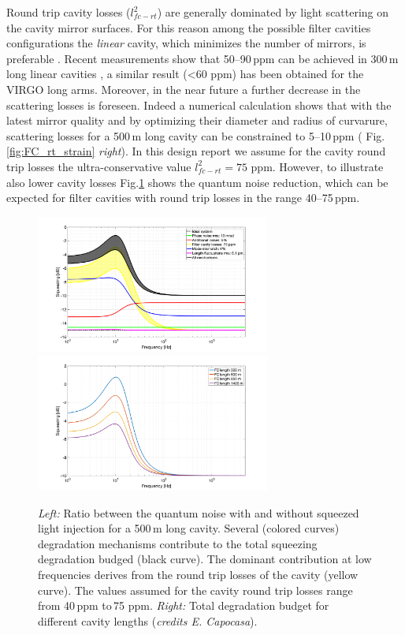 %
Round trip cavity losses ($l^2_{fc-rt}$) are generally dominated by light scattering on the cavity  mirror surfaces. For this reason among the possible filter cavities configurations the {\it linear} cavity, which minimizes the number of mirrors, is preferable \cite{Evans2013}.  Recent measurements show that 50--90\,ppm can be achieved in 300\,m long linear cavities \citep{Capocasa2018}, a similar result (<60 ppm) has been obtained  for the VIRGO long arms.  Moreover, in the near future a further decrease in the scattering losses is foreseen. Indeed a numerical calculation shows that  with the latest  mirror quality and by optimizing their  diameter and radius of curvarure, scattering losses for a 500\,m long cavity can be constrained to 5--10\,ppm ( Fig.\ref{fig:FC_rt_strain} {\it right}).
%
In this design report we assume for the cavity round trip losses the ultra-conservative value $l^2_{fc-rt}=75$ ppm. However, to illustrate also lower cavity losses Fig.\ref{fig:FCoptimization} shows the quantum noise reduction, which can be expected for filter cavities with round trip losses in the range 40--75\,ppm. 
%
\begin{figure}%
\includegraphics[width=77mm]{./Detector/DetFigures/ET_FC.png}
\includegraphics[width=77mm]{./Detector/DetFigures/FClength.png}
\caption{ {\it Left:} Ratio between the quantum noise with and without squeezed light injection for a 500\,m long cavity. Several (colored curves) degradation mechanisms contribute to the total squeezing degradation budged (black curve). The dominant contribution at low frequencies derives from the round trip losses of the cavity (yellow curve). The values assumed for the cavity round trip losses range from 40\,ppm to\,75 ppm. {\it Right:} Total degradation budget for different cavity lengths ({\it credits E. Capocasa}).} 
\label{fig:FCoptimization}
\end{figure} 
%

